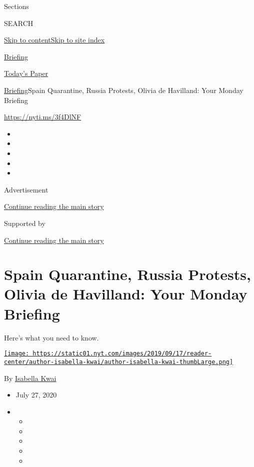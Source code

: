 Sections

SEARCH

\protect\hyperlink{site-content}{Skip to
content}\protect\hyperlink{site-index}{Skip to site index}

\href{https://www.nytimes.com/interactive/2018/briefing/global-morning-briefing-newsletter-signup.html}{Briefing}

\href{https://myaccount.nytimes.com/auth/login?response_type=cookie\&client_id=vi}{}

\href{https://www.nytimes.com/section/todayspaper}{Today's Paper}

\href{/interactive/2018/briefing/global-morning-briefing-newsletter-signup.html}{Briefing}\textbar{}Spain
Quarantine, Russia Protests, Olivia de Havilland: Your Monday Briefing

\url{https://nyti.ms/3f4DlNF}

\begin{itemize}
\item
\item
\item
\item
\item
\end{itemize}

Advertisement

\protect\hyperlink{after-top}{Continue reading the main story}

Supported by

\protect\hyperlink{after-sponsor}{Continue reading the main story}

\hypertarget{spain-quarantine-russia-protests-olivia-de-havilland-your-monday-briefing}{%
\section{Spain Quarantine, Russia Protests, Olivia de Havilland: Your
Monday
Briefing}\label{spain-quarantine-russia-protests-olivia-de-havilland-your-monday-briefing}}

Here's what you need to know.

\href{https://www.nytimes.com/by/isabella-kwai}{\texttt{[image: https://static01.nyt.com/images/2019/09/17/reader-center/author-isabella-kwai/author-isabella-kwai-thumbLarge.png]}}

By \href{https://www.nytimes.com/by/isabella-kwai}{Isabella Kwai}

\begin{itemize}
\item
  July 27, 2020
\item
  \begin{itemize}
  \item
  \item
  \item
  \item
  \item
  \end{itemize}
\end{itemize}

